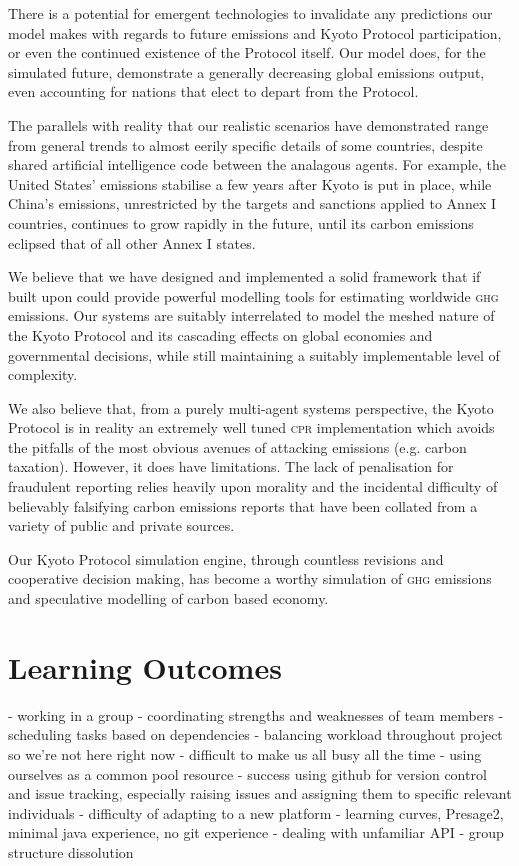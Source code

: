 There is a potential for emergent technologies to invalidate any predictions our model makes with regards to future emissions and Kyoto Protocol participation, or even the continued existence of the Protocol itself. Our model does, for the simulated future, demonstrate a generally decreasing global emissions output, even accounting for nations that elect to depart from the Protocol.

The parallels with reality that our realistic scenarios have demonstrated range from general trends to almost eerily specific details of some countries, despite shared artificial intelligence code between the analagous agents. For example, the United States' emissions stabilise a few years after Kyoto is put in place, while China's emissions, unrestricted by the targets and sanctions applied to Annex I countries, continues to grow rapidly in the future, until its carbon emissions eclipsed that of all other Annex I states.

We believe that we have designed and implemented a solid framework that if built upon could provide powerful modelling tools for estimating worldwide \textsc{ghg} emissions. Our systems are suitably interrelated to model the meshed nature of the Kyoto Protocol and its cascading effects on global economies and governmental decisions, while still maintaining a suitably implementable level of complexity.

We also believe that, from a purely multi-agent systems perspective, the Kyoto Protocol is in reality an extremely well tuned \textsc{cpr} implementation which avoids the pitfalls of the most obvious avenues of attacking \CO emissions (e.g. carbon taxation). However, it does have limitations. The lack of penalisation for fraudulent reporting relies heavily upon morality and the incidental difficulty of believably falsifying carbon emissions reports that have been collated from a variety of public and private sources.

Our Kyoto Protocol simulation engine, through countless revisions and cooperative decision making, has become a worthy simulation of \textsc{ghg} emissions and speculative modelling of carbon based economy.

\section{Learning Outcomes}

- working in a group
- coordinating strengths and weaknesses of team members
- scheduling tasks based on dependencies
- balancing workload throughout project so we're not here right now
- difficult to make us all busy all the time
- using ourselves as a common pool resource
- success using github for version control and issue tracking, especially raising issues and assigning them to specific relevant individuals
- difficulty of adapting to a new platform - learning curves, Presage2, minimal java experience, no git experience
- dealing with unfamiliar API
- group structure dissolution
